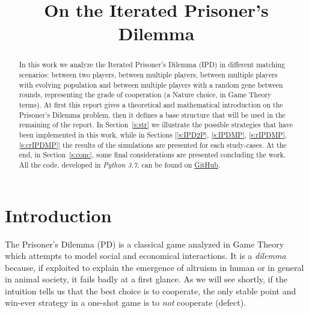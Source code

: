 \documentclass[journal,a4paper,10pt,twoside]{IEEEtran} %
\begin{document}
\title{On the Iterated Prisoner's Dilemma}

\author{%

}

\maketitle

\begin{abstract}
In this work we analyze the Iterated Prisoner's Dilemma (IPD) in different matching scenarios: between two players, between multiple players, between multiple players with evolving population and between multiple players with a random gene between rounds, representing the grade of cooperation (a Nature choice, in Game Theory terms).
At first this report gives a theoretical and mathematical introduction on the Prisoner's Dilemma problem, then it defines a base structure that will be used in the remaining of the report.
In Section~\ref{s:str} we illustrate the possible strategies that have been implemented in this work, while in Sections [\ref{s:IPD2P}, \ref{s:IPDMP}, \ref{s:rIPDMP}, \ref{s:crIPDMP}] the results of the simulations are presented for each study-cases.
At the end, in Section~\ref{s:conc}, some final considerations are presented concluding the work.
All the code, developed in \textit{Python 3.7}, can be found on \href{https://github.com/eliabntt/LaboratoryOfComputationalPhysics/tree/Group9}{GitHub}.
\end{abstract}

\section{Introduction} \label{s:intro}
The Prisoner's Dilemma (PD) is a classical game analyzed in Game Theory which attempts to model social and economical interactions. It is a \textit{dilemma} because, if exploited to explain the emergence of altruism in human or in general in animal society, it fails badly at a first glance. As we will see shortly, if the intuition tells us that the best choice is to cooperate, the only stable point and win-ever strategy in a one-shot game is to \textit{not} cooperate (defect).
\end{document}
